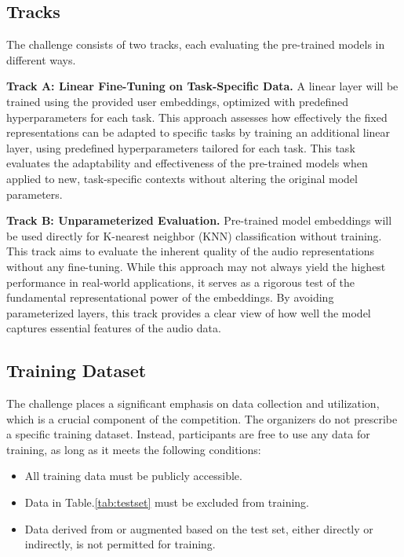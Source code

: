 \documentclass{article}
\begin{document}
\subsection{Tracks}
\label{sec:tasks}

The challenge consists of two tracks, each evaluating the pre-trained models in different ways.

\textbf{Track A: Linear Fine-Tuning on Task-Specific Data.} A linear layer will be trained using the provided user embeddings, optimized with predefined hyperparameters for each task.
This approach assesses how effectively the fixed representations can be adapted to specific tasks by training an additional linear layer,
using predefined hyperparameters tailored for each task.
This task evaluates the adaptability and effectiveness of the pre-trained models when applied to new,
task-specific contexts without altering the original model parameters.

\textbf{Track B: Unparameterized Evaluation.} Pre-trained model embeddings will be used directly for K-nearest neighbor (KNN) classification without training.
This track aims to evaluate the inherent quality of the audio representations without any fine-tuning.
While this approach may not always yield the highest performance in real-world applications,
it serves as a rigorous test of the fundamental representational power of the embeddings.
By avoiding parameterized layers, this track provides a clear view of how well the model captures essential features of the audio data.

\subsection{Training Dataset}

The challenge places a significant emphasis on data collection and utilization, which is a crucial component of the competition.
The organizers do not prescribe a specific training dataset.
Instead, participants are free to use any data for training, as long as it meets the following conditions:

\begin{itemize}[topsep=1ex]
\setlength{\parskip}{0pt}
    \item All training data must be publicly accessible.
    \item Data in Table.\ref{tab:testset} must be excluded from training.
    \item Data derived from or augmented based on the test set, either directly or indirectly, is not permitted for training.
\end{itemize}
\end{document}
